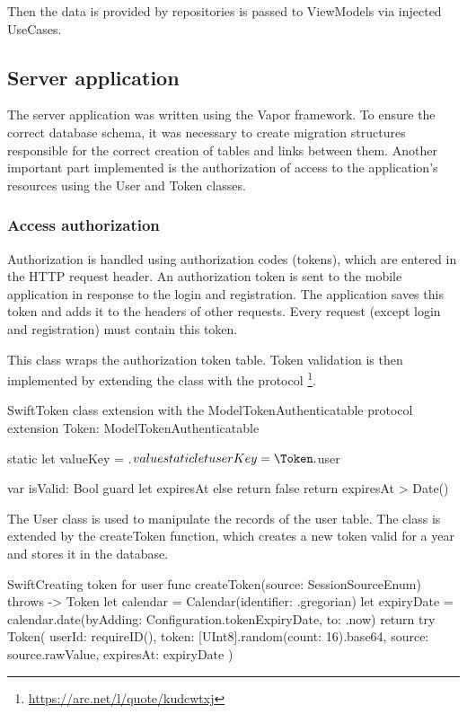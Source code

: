 \documentclass[
  biblatex = false,
  language=english,
  figures=false,
  sourcecodes,
  glossaries,
  index
]{kidiplom}
\begin{document}
Then the data is provided by repositories is passed to ViewModels via injected UseCases.

\subsection{Server application}
The server application was written using the Vapor framework. To ensure the correct database schema, it was necessary to create migration structures responsible for the correct creation of tables and links between them. Another important part implemented is the authorization of access to the application's resources using the User and Token classes.

\subsubsection{Access authorization}
Authorization is handled using authorization codes (tokens), which are entered in the HTTP request header. An authorization token is sent to the mobile application in response to the login and registration. The application saves this token and adds it to the headers of other requests. Every request (except login and registration) must contain this token.

This class wraps the authorization token table. Token validation is then implemented by extending the class with the  protocol \footnote{\url{https://arc.net/l/quote/kudcwtxj}}.

\FloatBarrier
\begin{kicode}{Swift}{}{Token class extension with the ModelTokenAuthenticatable protocol}
extension Token: ModelTokenAuthenticatable {
  static let valueKey = \Token.$value
  static let userKey = \Token.$user
  
  var isValid: Bool {
    guard let expiresAt else {
      return false
    }
    return expiresAt > Date()
  }
}
\end{kicode}
\FloatBarrier

The User class is used to manipulate the records of the user table. The class is extended by the createToken function, which creates a new token valid for a year and stores it in the database.

\FloatBarrier
\begin{kicode}{Swift}{}{Creating token for user}
func createToken(source: SessionSourceEnum) throws -> Token {
        let calendar = Calendar(identifier: .gregorian)
        let expiryDate = calendar.date(byAdding: Configuration.tokenExpiryDate, to: .now)
        return try Token(
            userId: requireID(),
            token: [UInt8].random(count: 16).base64,
            source: source.rawValue,
            expiresAt: expiryDate
        )
}
\end{kicode}
\FloatBarrier
\end{document}

